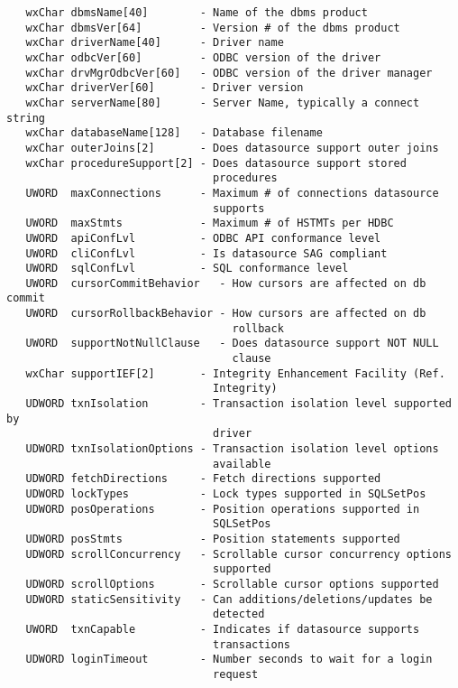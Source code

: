 \begin{verbatim}
   wxChar dbmsName[40]        - Name of the dbms product
   wxChar dbmsVer[64]         - Version # of the dbms product
   wxChar driverName[40]      - Driver name
   wxChar odbcVer[60]         - ODBC version of the driver
   wxChar drvMgrOdbcVer[60]   - ODBC version of the driver manager
   wxChar driverVer[60]       - Driver version
   wxChar serverName[80]      - Server Name, typically a connect string
   wxChar databaseName[128]   - Database filename
   wxChar outerJoins[2]       - Does datasource support outer joins
   wxChar procedureSupport[2] - Does datasource support stored 
                                procedures
   UWORD  maxConnections      - Maximum # of connections datasource 
                                supports
   UWORD  maxStmts            - Maximum # of HSTMTs per HDBC
   UWORD  apiConfLvl          - ODBC API conformance level
   UWORD  cliConfLvl          - Is datasource SAG compliant
   UWORD  sqlConfLvl          - SQL conformance level
   UWORD  cursorCommitBehavior   - How cursors are affected on db commit
   UWORD  cursorRollbackBehavior - How cursors are affected on db 
                                   rollback
   UWORD  supportNotNullClause   - Does datasource support NOT NULL 
                                   clause
   wxChar supportIEF[2]       - Integrity Enhancement Facility (Ref. 
                                Integrity)
   UDWORD txnIsolation        - Transaction isolation level supported by
                                driver
   UDWORD txnIsolationOptions - Transaction isolation level options 
                                available
   UDWORD fetchDirections     - Fetch directions supported
   UDWORD lockTypes           - Lock types supported in SQLSetPos
   UDWORD posOperations       - Position operations supported in 
                                SQLSetPos
   UDWORD posStmts            - Position statements supported
   UDWORD scrollConcurrency   - Scrollable cursor concurrency options 
                                supported
   UDWORD scrollOptions       - Scrollable cursor options supported
   UDWORD staticSensitivity   - Can additions/deletions/updates be 
                                detected
   UWORD  txnCapable          - Indicates if datasource supports 
                                transactions
   UDWORD loginTimeout        - Number seconds to wait for a login 
                                request
\end{verbatim}


